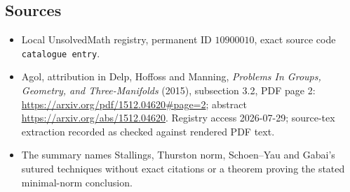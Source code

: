 \documentclass[11pt]{article}
\begin{document}
\subsection{Sources}
\begin{itemize}
\item Local UnsolvedMath registry, permanent ID \(10900010\), exact source code \texttt{catalogue entry}.
\item Agol, attribution in Delp, Hoffoss and Manning, \emph{Problems In Groups, Geometry, and Three-Manifolds} (2015), subsection 3.2, PDF page 2: \url{https://arxiv.org/pdf/1512.04620#page=2}; abstract \url{https://arxiv.org/abs/1512.04620}. Registry access 2026-07-29; source-tex extraction recorded as checked against rendered PDF text.
\item The summary names Stallings, Thurston norm, Schoen--Yau and Gabai's sutured techniques without exact citations or a theorem proving the stated minimal-norm conclusion.
\end{itemize}
\end{document}
